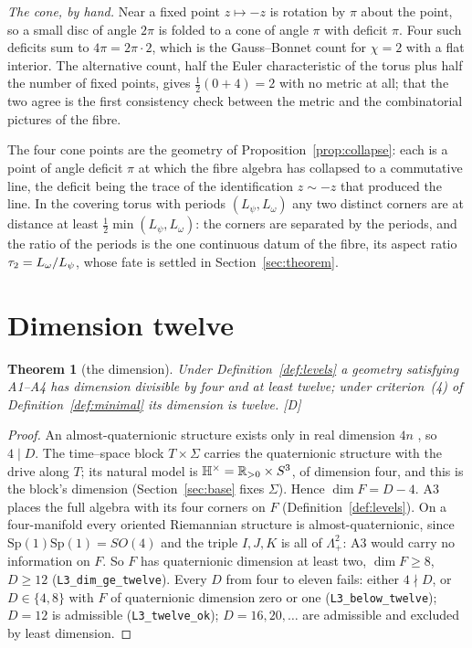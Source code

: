 \documentclass[11pt,a4paper]{article}
\theoremstyle{plain}
\newtheorem{theorem}{Theorem}[section]
\theoremstyle{definition}
\theoremstyle{remark}
\newcommand{\Hquat}{\mathbb{H}}
\newcommand{\rigD}{[\textup{D}]}
\begin{document}
\emph{The cone, by hand.} Near a fixed point $z\mapsto-z$ is rotation by $\pi$ about the point, so a small disc of angle $2\pi$ is folded to a cone of angle $\pi$ with deficit $\pi$. Four such deficits sum to $4\pi=2\pi\cdot2$, which is the Gauss--Bonnet count for $\chi=2$ with a flat interior. The alternative count, half the Euler characteristic of the torus plus half the number of fixed points, gives $\tfrac12(0+4)=2$ with no metric at all; that the two agree is the first consistency check between the metric and the combinatorial pictures of the fibre.

The four cone points are the geometry of Proposition~\ref{prop:collapse}: each is a point of angle deficit $\pi$ at which the fibre algebra has collapsed to a commutative line, the deficit being the trace of the identification $z\sim-z$ that produced the line. In the covering torus with periods $(L_{\psi},L_{\omega})$ any two distinct corners are at distance at least $\tfrac12\min(L_{\psi},L_{\omega})$: the corners are separated by the periods, and the ratio of the periods is the one continuous datum of the fibre, its aspect ratio $\tau_2=L_{\omega}/L_{\psi}$, whose fate is settled in Section~\ref{sec:theorem}.

\section{Dimension twelve}\label{sec:dimension}

\begin{theorem}[the dimension]\label{thm:dim}
Under Definition~\ref{def:levels} a geometry satisfying A1--A4 has dimension divisible by four and at least twelve; under criterion~(4) of Definition~\ref{def:minimal} its dimension is twelve. \rigD
\end{theorem}

\begin{proof}
An almost-quaternionic structure exists only in real dimension $4n$ \cite{Salamon1982}, so $4\mid D$. The time--space block $T\times\Sigma$ carries the quaternionic structure with the drive along $T$; its natural model is $\Hquat^{\times}=\R_{>0}\times S^{3}$, of dimension four, and this is the block's dimension (Section~\ref{sec:base} fixes $\Sigma$). Hence $\dim F=D-4$. A3 places the full algebra with its four corners on $F$ (Definition~\ref{def:levels}). On a four-manifold every oriented Riemannian structure is almost-quaternionic, since $\mathrm{Sp}(1)\mathrm{Sp}(1)=SO(4)$ and the triple $I,J,K$ is all of $\Lambda^{2}_{+}$: A3 would carry no information on $F$. So $F$ has quaternionic dimension at least two, $\dim F\geq8$, $D\geq12$ (\texttt{L3\_dim\_ge\_twelve}). Every $D$ from four to eleven fails: either $4\nmid D$, or $D\in\{4,8\}$ with $F$ of quaternionic dimension zero or one (\texttt{L3\_below\_twelve}); $D=12$ is admissible (\texttt{L3\_twelve\_ok}); $D=16,20,\dots$ are admissible and excluded by least dimension.
\end{proof}
\end{document}
